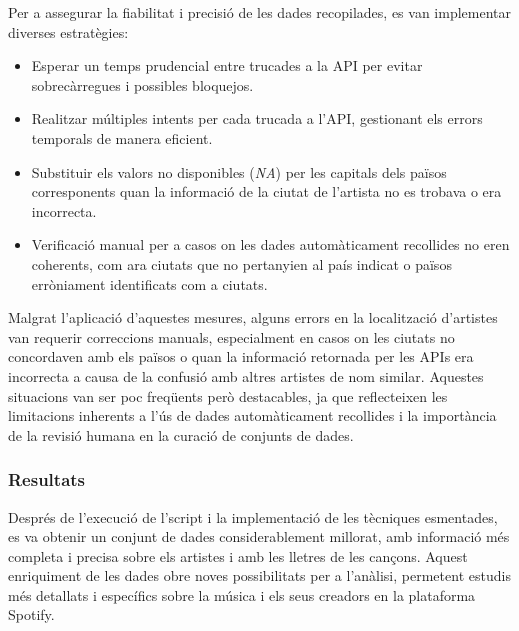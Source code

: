 Per a assegurar la fiabilitat i precisió de les dades recopilades, es van implementar diverses estratègies:
\begin{itemize}
    \item Esperar un temps prudencial entre trucades a la API per evitar sobrecàrregues i possibles bloquejos.
    \item Realitzar múltiples intents per cada trucada a l'API, gestionant els errors temporals de manera eficient.
    \item Substituir els valors no disponibles (\textit{NA}) per les capitals dels països corresponents quan la informació de la ciutat de l'artista no es trobava o era incorrecta.
    \item Verificació manual per a casos on les dades automàticament recollides no eren coherents, com ara ciutats que no pertanyien al país indicat o països erròniament identificats com a ciutats.
\end{itemize}

Malgrat l'aplicació d'aquestes mesures, alguns errors en la localització d'artistes van requerir correccions manuals, especialment en casos on les ciutats no concordaven amb els països o quan la informació retornada per les APIs era incorrecta a causa de la confusió amb altres artistes de nom similar. Aquestes situacions van ser poc freqüents però destacables, ja que reflecteixen les limitacions inherents a l'ús de dades automàticament recollides i la importància de la revisió humana en la curació de conjunts de dades.

\subsubsection{Resultats}

Després de l'execució de l'script i la implementació de les tècniques esmentades, es va obtenir un conjunt de dades considerablement millorat, amb informació més completa i precisa sobre els artistes i amb les lletres de les cançons. Aquest enriquiment de les dades obre noves possibilitats per a l'anàlisi, permetent estudis més detallats i específics sobre la música i els seus creadors en la plataforma Spotify.


